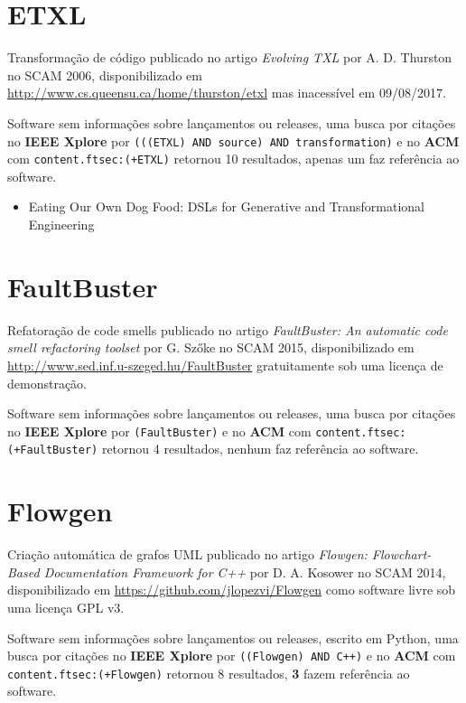 \section{ETXL}

Transformação de código
publicado no artigo {\it Evolving TXL}
por A. D. Thurston
no SCAM 2006,
disponibilizado em \url{http://www.cs.queensu.ca/home/thurston/etxl}
mas inacessível em 09/08/2017.

Software sem informações sobre lançamentos ou releases,
uma busca por citações no {\bf IEEE Xplore} por
\texttt{(((ETXL) AND source) AND transformation)}
e no {\bf ACM} com
\texttt{content.ftsec:(+ETXL)}
retornou
10 resultados,
apenas um faz referência ao software.

\begin{itemize}
\item Eating Our Own Dog Food: DSLs for Generative and Transformational Engineering
\end{itemize}

\section{FaultBuster}

Refatoração de code smells
publicado no artigo {\it FaultBuster: An automatic code smell refactoring toolset}
por G. Szőke
no SCAM 2015,
disponibilizado em \url{http://www.sed.inf.u-szeged.hu/FaultBuster}
gratuitamente
sob uma licença de demonstração.

Software sem informações sobre lançamentos ou releases,
uma busca por citações no {\bf IEEE Xplore} por
\texttt{(FaultBuster)}
e no {\bf ACM} com
\texttt{content.ftsec:(+FaultBuster)}
retornou
4 resultados,
nenhum faz referência ao software.


\section{Flowgen}

Criação automática de grafos UML
publicado no artigo {\it Flowgen: Flowchart-Based Documentation Framework for C++}
por D. A. Kosower
no SCAM 2014,
disponibilizado em \url{https://github.com/jlopezvi/Flowgen}
como software livre
sob uma licença GPL v3.

Software sem informações sobre lançamentos ou releases,
escrito em Python,
uma busca por citações no {\bf IEEE Xplore} por
\texttt{((Flowgen) AND C++)}
e no {\bf ACM} com
\texttt{content.ftsec:(+Flowgen)}
retornou
8 resultados,
{\bf 3} fazem referência ao software.

